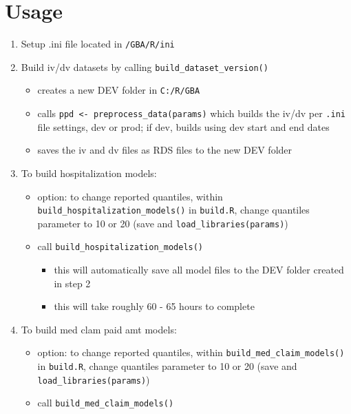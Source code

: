 \documentclass[
]{book}
\providecommand{\tightlist}{%
  \setlength{\itemsep}{0pt}\setlength{\parskip}{0pt}}
\begin{document}
\hypertarget{usage}{%
\section{Usage}\label{usage}}

\begin{enumerate}
\def\labelenumi{\arabic{enumi}.}
\tightlist
\item
  Setup .ini file located in \texttt{/GBA/R/ini}
\item
  Build iv/dv datasets by calling \texttt{build\_dataset\_version()}

  \begin{itemize}
  \tightlist
  \item
    creates a new DEV folder in \texttt{C:/R/GBA}
  \item
    calls \texttt{ppd\ \textless{}-\ preprocess\_data(params)} which builds the iv/dv per \texttt{.ini} file settings, dev or prod; if dev, builds using dev start and end dates
  \item
    saves the iv and dv files as RDS files to the new DEV folder
  \end{itemize}
\item
  To build hospitalization models:

  \begin{itemize}
  \tightlist
  \item
    option: to change reported quantiles, within \texttt{build\_hospitalization\_models()} in \texttt{build.R}, change quantiles parameter to 10 or 20 (save and \texttt{load\_libraries(params)})
  \item
    call \texttt{build\_hospitalization\_models()}

    \begin{itemize}
    \tightlist
    \item
      this will automatically save all model files to the DEV folder created in step 2
    \item
      this will take roughly 60 - 65 hours to complete
    \end{itemize}
  \end{itemize}
\item
  To build med clam paid amt models:

  \begin{itemize}
  \tightlist
  \item
    option: to change reported quantiles, within \texttt{build\_med\_claim\_models()} in \texttt{build.R}, change quantiles parameter to 10 or 20 (save and \texttt{load\_libraries(params)})
  \item
    call \texttt{build\_med\_claim\_models()}


\end{itemize}
\end{enumerate}
\end{document}
